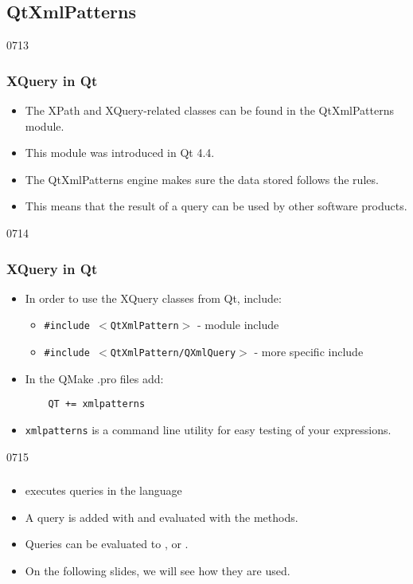 \subsection{QtXmlPatterns} \label{qtxmlpatterns}
\begin{slide}{0713}
\frametitle{XQuery in Qt}\label{xquery-qt}
\begin{itemize}
\item The XPath and XQuery-related classes can be found in the QtXmlPatterns module.
\item This module was introduced in Qt 4.4.
\item The QtXmlPatterns engine makes sure the data stored follows the  rules.
\item This means that the result of a query can be used by other software products.
\end{itemize}
\end{slide}


\begin{slide}[fragile]{0714}
\frametitle{XQuery in Qt}
\begin{itemize}
\item In order to use the XQuery classes from Qt, include:
\begin{itemize}
\item \texttt{\#include $<$QtXmlPattern$>$} - module include
\item \texttt{\#include $<$QtXmlPattern/QXmlQuery$>$} - more specific include
\end{itemize}
\item In the QMake .pro files add:
\begin{verbatim}
    QT += xmlpatterns
\end{verbatim}
\item \texttt{xmlpatterns} is a command line utility for easy testing of your  expressions.
\end{itemize}
\end{slide}


\begin{slide}{0715}
\frametitle{}
\begin{itemize}
\item {} executes queries in the  language
\item A query is added with  and evaluated with the  methods.
\item Queries can be evaluated to ,  or .
\item On the following slides, we will see how they are used.
\end{itemize}
\end{slide}


